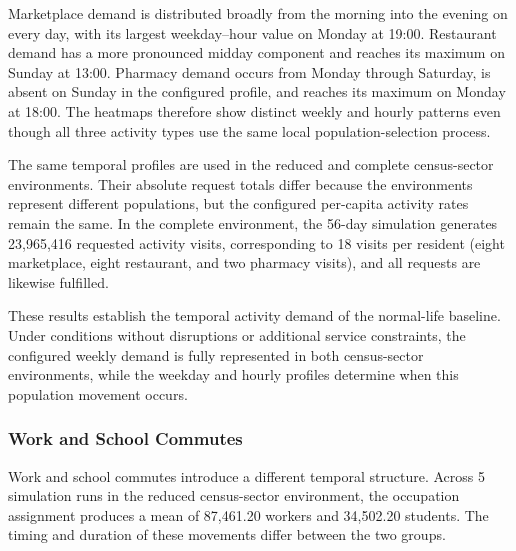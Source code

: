 Marketplace demand is distributed broadly from the morning into the evening on every day, with its largest weekday--hour value on Monday at 19:00. Restaurant demand has a more pronounced midday component and reaches its maximum on Sunday at 13:00. Pharmacy demand occurs from Monday through Saturday, is absent on Sunday in the configured profile, and reaches its maximum on Monday at 18:00. The heatmaps therefore show distinct weekly and hourly patterns even though all three activity types use the same local population-selection process.

The same temporal profiles are used in the reduced and complete census-sector environments. Their absolute request totals differ because the environments represent different populations, but the configured per-capita activity rates remain the same. %
In the complete environment, the 56-day simulation generates 23,965,416 requested activity visits, corresponding to 18 visits per resident (eight marketplace, eight restaurant, and two pharmacy visits), and all requests are likewise fulfilled.%

These results establish the temporal activity demand of the normal-life baseline. Under conditions without disruptions or additional service constraints, the configured weekly demand is fully represented in both census-sector environments, while the weekday and hourly profiles determine when this population movement occurs.

\subsubsection{Work and School Commutes}
\label{sec:routine_mobility_commute_temporal}

Work and school commutes introduce a different temporal structure. Across 5 simulation runs in the reduced census-sector environment, the occupation assignment produces a mean of 87,461.20 workers and 34,502.20 students. %
The timing and duration of these movements differ between the two groups.

